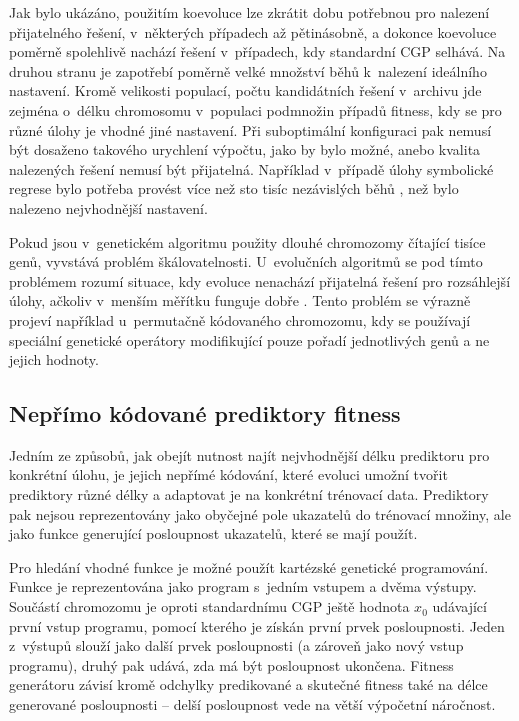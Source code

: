 Jak bylo ukázáno, použitím koevoluce lze zkrátit dobu potřebnou pro nalezení přijatelného řešení, v~některých případech až pětinásobně, a dokonce koevoluce poměrně spolehlivě nachází řešení v~případech, kdy standardní CGP selhává. Na druhou stranu je zapotřebí poměrně velké množství běhů k~nalezení ideálního nastavení. Kromě velikosti populací, počtu kandidátních řešení v~archivu jde zejména o~délku chromosomu v~populaci podmnožin případů fitness, kdy se pro různé úlohy je vhodné jiné nastavení. Při suboptimální konfiguraci pak nemusí být dosaženo takového urychlení výpočtu, jako by bylo možné, anebo kvalita nalezených řešení nemusí být přijatelná. Například v~případě úlohy symbolické regrese bylo potřeba provést více než sto tisíc nezávislých běhů \cite{SikuEuroGP}, než bylo nalezeno nejvhodnější nastavení.

Pokud jsou v~genetickém algoritmu použity dlouhé chromozomy čítající tisíce genů, vyvstává problém škálovatelnosti. U~evolučních algoritmů se pod tímto problémem rozumí situace, kdy evoluce nenachází přijatelná řešení pro rozsáhlejší úlohy, ačkoliv v~menším měřítku funguje dobře \cite{SikuKomjathy}. Tento problém se výrazně projeví například u~permutačně kódovaného chromozomu, kdy se používají speciální genetické operátory modifikující pouze pořadí jednotlivých genů a ne jejich hodnoty.

\subsection{Nepřímo kódované prediktory fitness}
\label{secIndirectPredictors}

Jedním ze způsobů, jak obejít nutnost najít nejvhodnější délku prediktoru pro konkrétní úlohu, je jejich nepřímé kódování, které evoluci umožní tvořit prediktory různé délky a adaptovat je na konkrétní trénovací data. Prediktory pak nejsou reprezentovány jako obyčejné pole ukazatelů do trénovací množiny, ale jako funkce generující posloupnost ukazatelů, které se mají použít.

Pro hledání vhodné funkce je možné použít kartézské genetické programování. Funkce je reprezentována jako program s~jedním vstupem a dvěma výstupy. Součástí chromozomu je oproti standardnímu CGP ještě hodnota $x_0$ udávající první vstup programu, pomocí kterého je získán první prvek posloupnosti. Jeden z~výstupů slouží jako další prvek posloupnosti (a zároveň jako nový vstup programu), druhý pak udává, zda má být posloupnost ukončena. Fitness generátoru závisí kromě odchylky predikované a skutečné fitness také na délce generované posloupnosti -- delší posloupnost vede na větší výpočetní náročnost.

